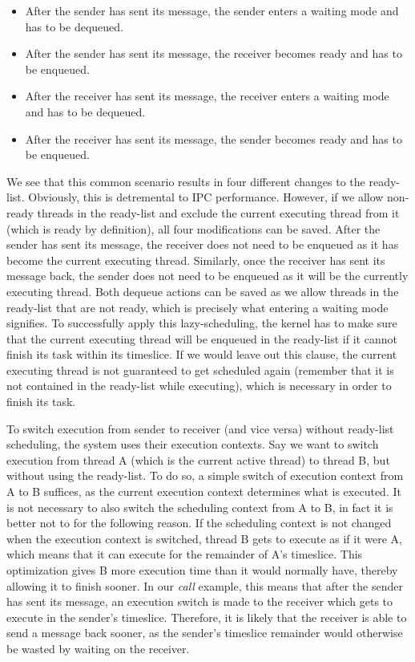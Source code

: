 \begin{itemize}
 \item After the sender has sent its message, the sender enters a waiting mode and has to be dequeued.
 \item After the sender has sent its message, the receiver becomes ready and has to be enqueued.
 \item After the receiver has sent its message, the receiver enters a waiting mode and has to be dequeued.
 \item After the receiver has sent its message, the sender becomes ready and has to be enqueued.
\end{itemize}

We see that this common scenario results in four different changes to the ready-list. Obviously, this is detremental to IPC performance. However, if we allow non-ready threads in the ready-list and exclude the current executing thread from it (which is ready by definition), all four modifications can be saved. After the sender has sent its message, the receiver does not need to be enqueued as it has become the current executing thread. Similarly, once the receiver has sent its message back, the sender does not need to be enqueued as it will be the currently executing thread. Both dequeue actions can be saved as we allow threads in the ready-list that are not ready, which is precisely what entering a waiting mode signifies. To successfully apply this lazy-scheduling, the kernel has to make sure that the current executing thread will be enqueued in the ready-list if it cannot finish its task within its timeslice. If we would leave out this clause, the current executing thread is not guaranteed to get scheduled again (remember that it is not contained in the ready-list while executing), which is necessary in order to finish its task.\emptyline

To switch execution from sender to receiver (and vice versa) without ready-list scheduling, the system uses their execution contexts. Say we want to switch execution from thread A (which is the current active thread) to thread B, but without using the ready-list. To do so, a simple switch of execution context from A to B suffices, as the current execution context determines what is executed. It is not necessary to also switch the scheduling context from A to B, in fact it is better not to for the following reason. If the scheduling context is not changed when the execution context is switched, thread B gets to execute as if it were A, which means that it can execute for the remainder of A's timeslice. This optimization gives B more execution time than it would normally have, thereby allowing it to finish sooner. In our \emph{call} example, this means that after the sender has sent its message, an execution switch is made to the receiver which gets to execute in the sender's timeslice. Therefore, it is likely that the receiver is able to send a message back sooner, as the sender's timeslice remainder would otherwise be wasted by waiting on the receiver.\emptyline

